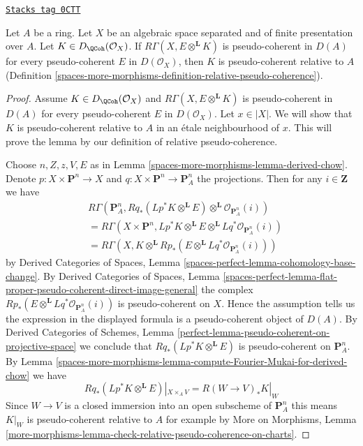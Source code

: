 \begin{lemma}
\label{spaces-more-morphisms-lemma-characterize-pseudo-coherent}
\href{https://stacks.math.columbia.edu/tag/0CTT}{\texttt{Stacks tag 0CTT}}

Let $A$ be a ring. Let $X$ be an algebraic space separated and
of finite presentation over $A$. Let $K \in D_\QCoh(\mathcal{O}_X)$.
If $R\Gamma(X, E \otimes^\mathbf{L} K)$ is pseudo-coherent
in $D(A)$ for every pseudo-coherent $E$ in $D(\mathcal{O}_X)$,
then $K$ is pseudo-coherent relative to $A$
(Definition \ref{spaces-more-morphisms-definition-relative-pseudo-coherence}).
\end{lemma}

\begin{proof}
Assume $K \in D_\QCoh(\mathcal{O}_X)$ and
$R\Gamma(X, E \otimes^\mathbf{L} K)$ is pseudo-coherent
in $D(A)$ for every pseudo-coherent $E$ in $D(\mathcal{O}_X)$.
Let $x \in |X|$. We will show that $K$ is pseudo-coherent relative to $A$
in an \'etale neighbourhood of $x$. This will prove the lemma
by our definition of relative pseudo-coherence.

\medskip\noindent
Choose $n, Z, z, V, E$ as in Lemma \ref{spaces-more-morphisms-lemma-derived-chow}.
Denote $p : X \times \mathbf{P}^n \to X$ and
$q : X \times \mathbf{P}^n \to \mathbf{P}^n_A$
the projections.
Then for any $i \in \mathbf{Z}$ we have
\begin{align*}
& R\Gamma(\mathbf{P}^n_A,
Rq_*(Lp^*K \otimes^\mathbf{L} E)
\otimes^\mathbf{L}
\mathcal{O}_{\mathbf{P}^n_A}(i)) \\
& =
R\Gamma(X \times \mathbf{P}^n,
Lp^*K \otimes^\mathbf{L} E \otimes^\mathbf{L}
Lq^*\mathcal{O}_{\mathbf{P}^n_A}(i)) \\
& =
R\Gamma(X,
K \otimes^\mathbf{L} Rp_*(E \otimes^\mathbf{L}
Lq^*\mathcal{O}_{\mathbf{P}^n_A}(i)))
\end{align*}
by
Derived Categories of Spaces,
Lemma \ref{spaces-perfect-lemma-cohomology-base-change}.
By
Derived Categories of Spaces, Lemma
\ref{spaces-perfect-lemma-flat-proper-pseudo-coherent-direct-image-general}
the complex $Rp_*(E \otimes^\mathbf{L} Lq^*\mathcal{O}_{\mathbf{P}^n_A}(i))$
is pseudo-coherent on $X$. Hence the assumption tells us the expression
in the displayed formula is a pseudo-coherent object of $D(A)$.
By
Derived Categories of Schemes,
Lemma \ref{perfect-lemma-pseudo-coherent-on-projective-space}
we conclude that $Rq_*(Lp^*K \otimes^\mathbf{L} E)$ is
pseudo-coherent on $\mathbf{P}^n_A$.
By Lemma \ref{spaces-more-morphisms-lemma-compute-Fourier-Mukai-for-derived-chow}
we have
$$
Rq_*(Lp^*K \otimes^\mathbf{L} E)|_{X \times_A V} =
R(W \to V)_*K|_W
$$
Since $W \to V$ is a closed immersion into an open subscheme of
$\mathbf{P}^n_A$ this means $K|_W$ is pseudo-coherent relative to $A$
for example by
More on Morphisms,
Lemma \ref{more-morphisms-lemma-check-relative-pseudo-coherence-on-charts}.
\end{proof}


